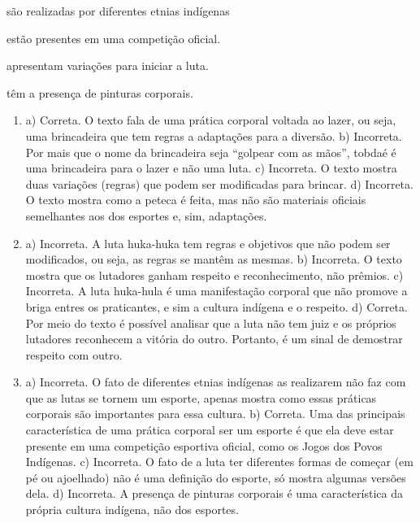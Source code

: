 \begin{escolha}
\item são realizadas por diferentes etnias indígenas

\item estão presentes em uma competição oficial.

\item apresentam variações para iniciar a luta.

\item têm a presença de pinturas corporais.
\end{escolha}



\begin{enumerate}

\item
a) Correta. O texto fala de uma prática corporal voltada ao lazer, ou
seja, uma brincadeira que tem regras a adaptações para a diversão.
b) Incorreta. Por mais que o nome da brincadeira seja “golpear com as
mãos”, tobdaé é uma brincadeira para o lazer e não uma luta.
c) Incorreta. O texto mostra duas variações (regras) que podem ser
modificadas para brincar.
d) Incorreta. O texto mostra como a peteca é feita, mas não são
materiais oficiais semelhantes aos dos esportes e, sim, adaptações.

\item
a) Incorreta. A luta huka-huka tem regras e objetivos que não podem ser
modificados, ou seja, as regras se mantêm as mesmas.
b) Incorreta. O texto mostra que os lutadores ganham respeito e
reconhecimento, não prêmios.
c) Incorreta. A luta huka-hula é uma manifestação corporal que não
promove a briga entres os praticantes, e sim a cultura indígena e o
respeito.
d) Correta. Por meio do texto é possível analisar que a luta não tem
juiz e os próprios lutadores reconhecem a vitória do outro. Portanto, é
um sinal de demostrar respeito com outro.

\item
a) Incorreta. O fato de diferentes etnias indígenas as realizarem não faz com que as
lutas se tornem um esporte, apenas mostra como essas práticas corporais
são importantes para essa cultura.
b) Correta. Uma das principais característica de uma prática corporal
ser um esporte é que ela deve estar presente em uma competição esportiva
oficial, como os Jogos dos Povos Indígenas.
c) Incorreta. O fato de a luta ter diferentes formas de começar (em pé ou
ajoelhado) não é uma definição do esporte, só mostra algumas versões dela.
d) Incorreta. A presença de pinturas corporais é uma característica da própria
cultura indígena, não dos esportes.
\end{enumerate}

